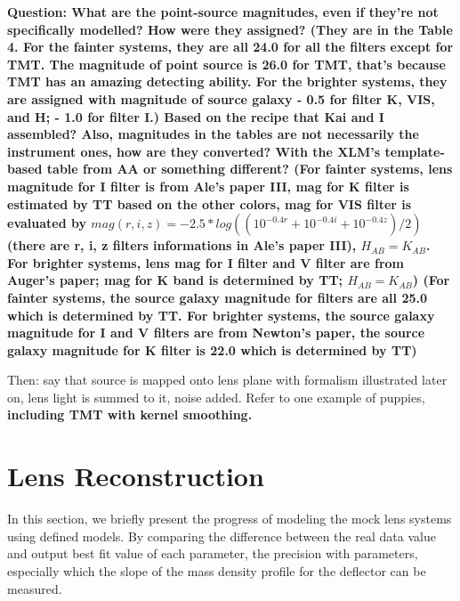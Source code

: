 \documentclass[a4paper,11pt]{article}
\begin{document}
 
\textbf{{Question}: What are the point-source magnitudes, even if they're not specifically modelled? How were they assigned? (They are in the Table 4. For the fainter systems, they are all 24.0 for all the filters except for TMT. The magnitude of point source is 26.0 for TMT, that's because TMT has an amazing detecting ability. For the brighter systems, they are assigned with magnitude of source galaxy - 0.5 for filter K, VIS, and H; - 1.0 for filter I.)
 Based on the recipe that Kai and I assembled? Also, magnitudes in the tables are not necessarily the instrument ones, how are they converted? With the XLM's template-based table from AA or something different? (For fainter systems, lens magnitude for I filter is from Ale's paper III, mag for K filter is estimated by TT based on the other colors, mag for VIS filter is evaluated by $mag(r,i,z)=-2.5*log((10^{-0.4r}+10^{-0.4i}+10^{-0.4z})/2)$ (there are r, i, z filters informations in Ale's paper III), $H_{AB}=K_{AB}$. For brighter systems, lens mag for I filter and V filter are from Auger's paper; mag for K band is determined by TT;  $H_{AB}=K_{AB}$) (For fainter systems, the source galaxy magnitude for filters are all 25.0 which is determined by TT. For brighter systems, the source galaxy magnitude for I and V filters are from Newton's paper, the source galaxy magnitude for K filter is 22.0 which is determined by TT)}

Then: say that source is mapped onto lens plane with formalism illustrated later on, lens light is summed to it, noise added. Refer to one example of puppies, \textbf{including TMT with kernel smoothing.}

\section{Lens Reconstruction}


In this section, we briefly present the progress of modeling the mock lens systems using defined models. By comparing the difference between the real data value and output best fit value of each parameter, the precision with parameters, especially which the slope of the mass density profile for the deflector can be measured.
\end{document}
